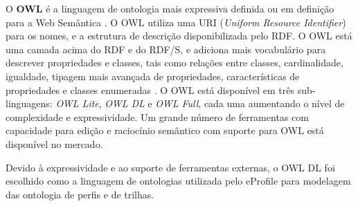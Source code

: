 O \textbf{OWL} é a linguagem de ontologia mais expressiva definida ou em definição para a Web Semântica \cite{daconta03}. O OWL utiliza uma URI ({\em Uniform Resource Identifier}) para os nomes, e a estrutura de descrição disponibilizada pelo RDF. O OWL está uma camada acima do RDF e do RDF/S, e adiciona mais vocabulário para descrever propriedades e classes, tais como relações entre classes, cardinalidade, igualdade, tipagem mais avançada de propriedades, características de propriedades e classes enumeradas \cite{owl-guide}. O OWL está disponível em três sub-linguagens: {\em OWL Lite}, {\em OWL DL} e {\em OWL Full}, cada uma aumentando o nível de complexidade e expressividade. Um grande número de ferramentas com capacidade para edição e raciocínio semântico com suporte para OWL está disponível no mercado.

Devido à expressividade e ao suporte de ferramentas externas, o OWL DL foi escolhido como a linguagem de ontologias utilizada pelo eProfile para modelagem das ontologia de perfis e de trilhas.





